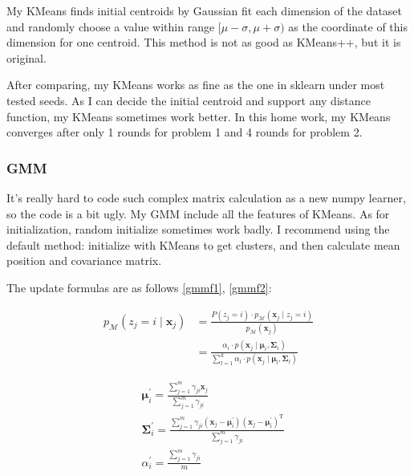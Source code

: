 \documentclass[conference]{IEEEtran}
\begin{document}
My KMeans finds initial centroids by Gaussian fit each dimension of the dataset and randomly choose a value within range $[\mu-\sigma, \mu+\sigma)$ as the coordinate of this dimension for one centroid. This method is not as good as KMeans++, but it is original.

After comparing, my KMeans works as fine as the one in sklearn under most tested seeds. As I can decide the initial centroid and support any distance function, my KMeans sometimes work better. In this home work, my KMeans converges after only 1 rounds for problem 1 and 4 rounds for problem 2.

\subsubsection{\textbf{GMM}}
It's really hard to code such complex matrix calculation as a new numpy learner, so the code is a bit ugly. My GMM include all the features of KMeans. As for initialization, random initialize sometimes work badly. I recommend using the default method: initialize with KMeans to get clusters, and then calculate mean position and covariance matrix.

The update formulas are as follows \ref{gmmf1}, \ref{gmmf2}:

 \begin{equation}
 	\begin{aligned}
 		p_{\mathcal{M}}\left(z_{j}=i \mid \boldsymbol{x}_{j}\right) &=\frac{P\left(z_{j}=i\right) \cdot p_{\mathcal{M}}\left(\boldsymbol{x}_{j} \mid 	z_{j}=i\right)}{p_{\mathcal{M}}\left(\boldsymbol{x}_{j}\right)} \\
 		&=\frac{\alpha_{i} \cdot p\left(\boldsymbol{x}_{j} \mid \boldsymbol{\mu}_{i}, \boldsymbol{\Sigma}_{i}\right)}{\sum_{l=1}^{k} \alpha_{l} \cdot p\left(\boldsymbol{x}_{j} \mid \boldsymbol{\mu}_{l}, \boldsymbol{\Sigma}_{l}\right)}
 	\label{gmmf1}
 	\end{aligned}
 \end{equation}

 \begin{equation}
 	\begin{aligned}
 		&\boldsymbol{\mu}_{i}^{\prime}=\frac{\sum_{j=1}^{m} \gamma_{j i} \boldsymbol{x}_{j}}{\sum_{j=1}^{m} \gamma_{j i}} \\
 		&\boldsymbol{\Sigma}_{i}^{\prime}=\frac{\sum_{j=1}^{m} \gamma_{j i}\left(\boldsymbol{x}_{j}-\boldsymbol{\mu}_{i}^{\prime}\right)\left(\boldsymbol{x}_{j}-\boldsymbol{\mu}_{i}^{\prime}\right)^{\mathrm{T}}}{\sum_{j=1}^{m} \gamma_{j i}} \\
 		&\alpha_{i}^{\prime}=\frac{\sum_{j=1}^{m} \gamma_{j i}}{m}
 	\end{aligned}
 	\label{gmmf2}
 \end{equation}
\end{document}
